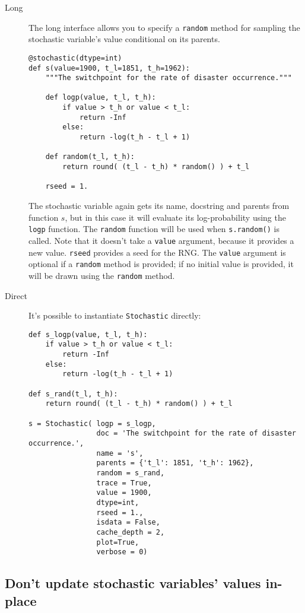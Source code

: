 \begin{description}
    \item[Long] The long interface allows you to specify a \texttt{random} method for sampling the stochastic variable's value conditional on its parents.
    \begin{verbatim}
@stochastic(dtype=int)
def s(value=1900, t_l=1851, t_h=1962):
    """The switchpoint for the rate of disaster occurrence."""

    def logp(value, t_l, t_h):
        if value > t_h or value < t_l:
            return -Inf
        else:
            return -log(t_h - t_l + 1) 
            
    def random(t_l, t_h):
        return round( (t_l - t_h) * random() ) + t_l

    rseed = 1.
    \end{verbatim}
The stochastic variable again gets its name, docstring and parents from function $s$, but in this case it will evaluate its log-probability using the \texttt{logp} function. The \texttt{random} function will be used when \texttt{s.random()} is called. Note that it doesn't take a \texttt{value} argument, because it provides a new value. \texttt{rseed} provides a seed for the RNG. The \texttt{value} argument is optional if a \texttt{random} method is provided; if no initial value is provided, it will be drawn using the \texttt{random} method.

    \item[Direct] It's possible to instantiate \texttt{Stochastic} directly:
\begin{verbatim}
def s_logp(value, t_l, t_h):
    if value > t_h or value < t_l:
        return -Inf
    else:
        return -log(t_h - t_l + 1) 

def s_rand(t_l, t_h):
    return round( (t_l - t_h) * random() ) + t_l

s = Stochastic( logp = s_logp, 
                doc = 'The switchpoint for the rate of disaster occurrence.',
                name = 's', 
                parents = {'t_l': 1851, 't_h': 1962},
                random = s_rand,                 
                trace = True,                 
                value = 1900,
                dtype=int,
                rseed = 1., 
                isdata = False,
                cache_depth = 2,
                plot=True,
                verbose = 0)
\end{verbatim}
\end{description}

\hypertarget{sub:warning}{}
\subsection*{Don't update stochastic variables' values in-place} \label{sub:warning}

